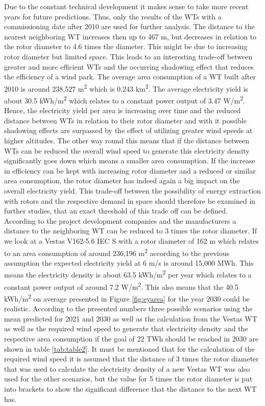 \documentclass[a4paper,11pt]{article}
\begin{document}
Due to the constant technical development it makes sense to take more recent years for future predictions. Thus, only the results of the WTs with a commissioning date after 2010 are used for further analysis. The distance to the nearest neighboring WT increases then up to 467 m, but decreases in relation to the rotor diameter to 4.6 times the diameter. This might be due to increasing rotor diameter but limited space. This leads to an interesting trade-off between greater and more efficient WTs and the occurring shadowing effect that reduces the efficiency of a wind park. The average area consumption of a WT built after 2010 is around 238,527 m\textsuperscript{2} which is 0.243 km\textsuperscript{2}. The average electricity yield is about 30.5 kWh/m\textsuperscript{2} which relates to a constant power output of 3.47 W/m\textsuperscript{2}. Hence, the electricity yield per area is increasing over time and the reduced distance between WTs in relation to their rotor diameter and with it possible shadowing effects are surpassed by the effect of utilizing greater wind speeds at higher altitudes. The other way round this means that if the distance between WTs can be reduced the overall wind speed to generate this electricity density significantly goes down which means a smaller area consumption. If the increase in efficiency can be kept with increasing rotor diameter and a reduced or similar area consumption, the rotor diameter has indeed again a big impact on the overall electricity yield. This trade-off between the possibility of energy extraction with rotors and the respective demand in space should therefore be examined in further studies, that an exact threshold of this trade off can be defined. According to the project development companies and the manufacturers a distance to the neighboring WT can be reduced to 3 times the rotor diameter. If we look at a Vestas V162-5.6 IEC S with a rotor diameter of 162 m which relates to an area consumption of around 236,196 m\textsuperscript{2} according to the previous assumption the expected electricity yield at 6 m/s is around 15,000 MWh. This means the electricity density is about 63.5 kWh/m\textsuperscript{2} per year which relates to a constant power output of around 7.2 W/m\textsuperscript{2}. This also means that the 40.5 kWh/m\textsuperscript{2} on average presented in Figure \ref{fig:eyarea} for the year 2030 could be realistic. According to the presented numbers three possible scenarios using the mean predicted for 2021 and 2030 as well as the calculation from the Vestas WT as well as the required wind speed to generate that electricity density and the respective area consumption if the goal of 22 TWh should be reached in 2030 are shown in table \ref{tab:table2}. It must be mentioned that for the calculation of the required wind speed it is assumed that the distance of 3 times the rotor diameter that was used to calculate the electricity density of a new Vestas WT was also used for the other scenarios, but the value for 5 times the rotor diameter is put into brackets to show the significant difference that the distance to the next WT has.
\end{document}
